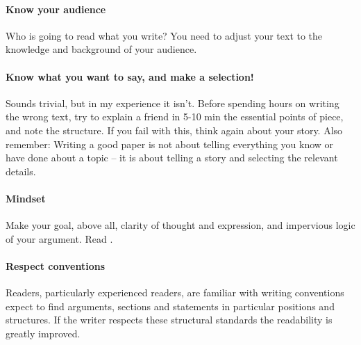 \documentclass{tufte-book}
\begin{document}
\paragraph{Know your audience}Who is going to read what you write?  You need to adjust your text to the knowledge and background of your audience. 


\paragraph{Know what you want to say, and make a selection!}Sounds trivial, but in my experience it isn't. Before spending hours on writing the wrong text, try to explain a friend in 5-10 min the essential points of piece, and note the structure. If you fail with this, think again about your story. Also remember: Writing a good paper is not about telling everything you know or have done about a topic -- it is about telling a story and selecting the relevant details. 

\paragraph{Mindset} Make your goal, above all, clarity of thought and expression, and impervious logic of your argument. Read \citet{Woodford-Sounderthinkingthrough-1967}.

\paragraph{Respect conventions} Readers, particularly experienced readers, are familiar with writing conventions expect to find arguments, sections and statements in particular positions and structures. If the writer respects these structural standards the readability is greatly improved. 
\end{document}
